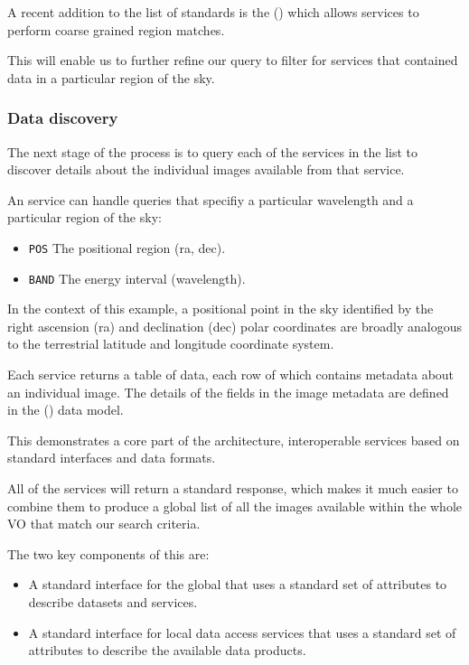 \documentclass{article}
\begin{document}
A recent addition to the list of \cite{ivoa} standards is the
 (\cite{ivoa-moc}) which allows \cite{ivoa-reg}
services to perform coarse grained region matches.

This will enable us to further refine our \cite{ivoa-reg} query to filter
for \cite{ivoa-sia} services that contained data in a particular region of
the sky.

\subsubsection{Data discovery}

The next stage of the process is to query each of the \cite{ivoa-sia}
services in the list to discover details about the individual images
available from that service.

\noindent
An \cite{ivoa-sia} service can handle queries that specifiy a particular
wavelength and a particular region of the sky:
\begin{itemize}
  \item \texttt{POS}  The positional region (ra, dec).
  \item \texttt{BAND} The energy interval (wavelength).
\end{itemize}

In the context of this example, a positional point in the sky identified
by the right ascension (ra) and declination (dec) polar coordinates are
broadly analogous to the terrestrial latitude and longitude coordinate system.

Each \cite{ivoa-sia} service returns a table of data, each row of which
contains metadata about an individual image. The details of the fields
in the image metadata are defined in the 
(\cite{ivoa-obscore}) data model.

This demonstrates a core part of the \cite{ivoa} architecture, interoperable
services based on standard interfaces and data formats.

All of the \cite{ivoa-sia} services will return a standard response, which
makes it much easier to combine them to produce a global list of all the
images available within the whole VO that match our search criteria.

\noindent
The two key components of this are:
\begin{itemize}
    \item A standard interface for the global \cite{ivoa-reg} that uses a
    standard set of attributes to describe datasets and services.
    \item A standard interface for local \cite{ivoa-sia} data access services
    that uses a standard set of attributes to describe the available data
    products.
\end{itemize}
\end{document}
